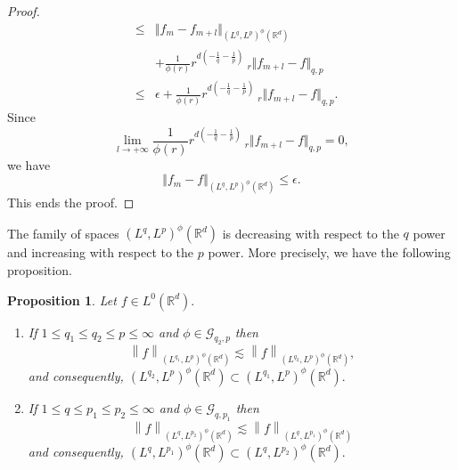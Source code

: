\documentclass[a4paper,12pt,intlimits,oneside]{amsart}
\numberwithin{equation}{section}
\newtheorem{proposition}[theorem]{Proposition}
\numberwithin{equation}{section}
\theoremstyle{definition}
\begin{document}
\begin{proof}
\begin{eqnarray*}
 & \leq &  \Vert f_{m} - f_{m+l}  \Vert_{(L^{q},L^{p})^{\phi}(\mathbb{R}^{d})} \\
 & & + \frac{1}{\phi(r)} r^{d(-\frac{1}{q}-\frac{1}{p})} \:_{r}\Vert f_{m+l} -f \Vert_{q,p}\\
 &\leq& \epsilon + \frac{1}{\phi(r)} r^{d(-\frac{1}{q}-\frac{1}{p})} \:_{r}\Vert f_{m+l} -f \Vert_{q,p}.
 \end{eqnarray*}
 Since	
 	$$ \lim\limits_{l \rightarrow	 + \infty}  \frac{1}{\phi(r)} r^{d(-\frac{1}{q}-\frac{1}{p})} \:_{r}\Vert f_{m+l} -f \Vert_{q,p} = 0,$$ we have
 	 $$ \Vert f_{m} - f \Vert_{(L^{q},L^{p})^{\phi}(\mathbb{R}^{d})}  \leq \epsilon .$$	
 This ends the proof.
\end{proof}

 The family of spaces $ (L^{q},L^{p})^{\phi}(\mathbb{R}^{d}) $ is decreasing with respect to the $ q $ power
 and increasing with respect to the $ p $ power. More precisely, we have the following proposition.
 \begin{proposition}\label{prop 1}
 Let  $ f \in L^{0}(\mathbb{R}^{d}). $    
 \begin{enumerate}
 \item If $1\leq q_{1}\leq q_{2} \leq p \leq\infty$ and $ \phi \in \mathcal{G}_{q_{2},p} $ then 
 $$\left\| f \right\|_{(L^{q_{1}},L^{p})^{\phi }(\mathbb{R}^{d})} \lesssim \left\|f\right\|_{(L^{q_{2}},L^{p})^{\phi }(\mathbb{R}^{d})},$$ and consequently, $(L^{q_{2}},L^{p})^{\phi}(\mathbb{R}^{d})\subset (L^{q_{1}},L^{p})^{\phi}(\mathbb{R}^{d}).$
 \item If $1\leq q\leq p_{1} \leq p_{2} \leq\infty$ and $ \phi \in \mathcal{G}_{q,p_{1}} $ then 
 $$\left\| f \right\|_{(L^{q},L^{p_{2}})^{\phi}(\mathbb{R}^{d})} \lesssim \left\|f\right\|_{(L^{q},L^{p_{1}})^{\phi}(\mathbb{R}^{d})}$$ and consequently, $(L^{q},L^{p_{1}})^{\phi}(\mathbb{R}^{d})\subset (L^{q},L^{p_{2}})^{\phi}(\mathbb{R}^{d}).$
 \end{enumerate}
 \end{proposition}
 
\end{document}
